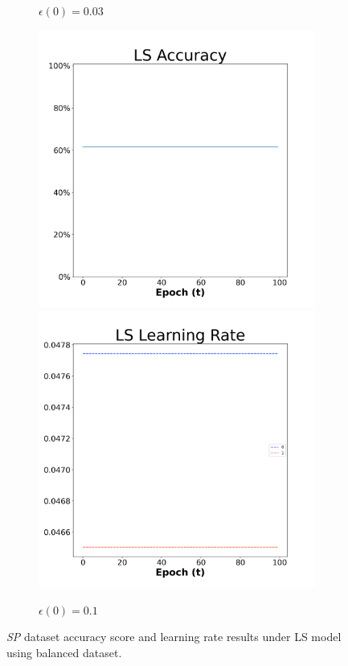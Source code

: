 \begin{figure}[H]
\begin{subfigure}{0.3\textwidth}
  \caption{$\epsilon(0)=0.03$}
\end{subfigure}\hfil %
\begin{subfigure}{0.3\textwidth}
  \includegraphics[width=\linewidth]{images/exper1/SP/LS_0.1_acc.png}
  \includegraphics[width=\linewidth]{images/exper1/SP/LS_0.1_lr.png}
  \caption{$\epsilon(0)=0.1$}
\end{subfigure}

\caption{\textit{SP} dataset accuracy score and learning rate results under LS model using balanced dataset.}
\end{figure}

